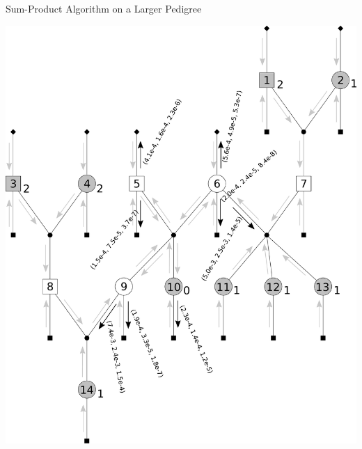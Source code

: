 \documentclass[letter,graphicx]{beamer}
\begin{document}
\begin{frame}{Sum-Product Algorithm on a Larger Pedigree} 
\begin{center} 
\includegraphics[height = 0.8\textheight]{./images/mg-example-step8.pdf} 
\end{center}
\end{frame}
\end{document}
